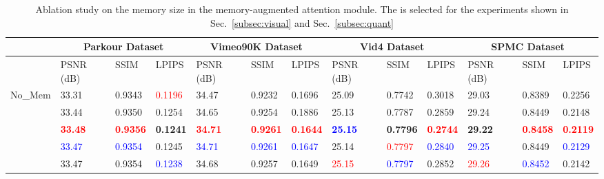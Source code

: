 \begin{table*}[t]
\footnotesize
\centering
\begin{tabular}{p{}||p{}<{\centering}|p{}<{\centering}|p{}<{\centering}||p{}<{\centering}|p{}<{\centering}|p{}<{\centering}||p{}<{\centering}|p{}<{\centering}|p{}<{\centering}||p{}<{\centering}|p{}<{\centering}|p{}<{\centering}}
            & \multicolumn{3}{c||}{Parkour Dataset} & \multicolumn{3}{c||}{Vimeo90K Dataset~\cite{vimeo90k}}    & \multicolumn{3}{c||}{Vid4 Dataset~\cite{frvsr}}  &  \multicolumn{3}{c}{SPMC Dataset~\cite{spmc}}     \\ \hline
            & PSNR (dB)          & SSIM    &LPIPS        & PSNR (dB) & SSIM &LPIPS  & PSNR (dB) & SSIM &LPIPS & PSNR (dB) & SSIM &LPIPS                        \\ \hline
No\_Mem     & 33.31              & 0.9343  &\textcolor{red}{0.1196}        & 34.47    & 0.9232 & 0.1696 & 25.09     & 0.7742  &0.3018 &29.03 &0.8389 &0.2256                    \\ \hline
  & 33.44              & 0.9350     &0.1254     & 34.65       & 0.9254 &0.1886  & 25.13     & 0.7787  &0.2859 &29.24 &0.8449 & 0.2148                   \\ \hline
        & \textbf{\textcolor{red}{33.48}}              & \textbf{\textcolor{red}{0.9356}}    &\textbf{0.1241}      & \textbf{\textcolor{red}{34.71}}               & \textbf{\textcolor{red}{0.9261}} &\textbf{\textcolor{red}{0.1644}}  & \textbf{\textcolor{blue}{25.15}}     & \textbf{0.7796} &\textbf{\textcolor{red}{0.2744}} &\textbf{29.22} &\textbf{\textcolor{red}{0.8458}} &\textbf{\textcolor{red}{0.2119}}                     \\ \hline
      & \textcolor{blue}{33.47}              & \textcolor{blue}{0.9354}   &0.1245       & \textcolor{blue}{34.71}               & \textcolor{blue}{0.9261} &\textcolor{blue}{0.1647}  & 25.14     & \textcolor{red}{0.7797}  &\textcolor{blue}{0.2840} &\textcolor{blue}{29.25} &0.8449 &\textcolor{blue}{0.2129}                    \\ \hline
         & 33.47 & 0.9354  &\textcolor{blue}{0.1238}  & 34.68   & 0.9257 &0.1649   & \textcolor{red}{25.15}     & \textcolor{blue}{0.7797}   &0.2852 &\textcolor{red}{29.26} &\textcolor{blue}{0.8452} &0.2142                   \\ \hline
\end{tabular}
\caption{Ablation study on the memory size in the memory-augmented attention module. The  is selected for the experiments shown in Sec.~\ref{subsec:visual} and Sec.~\ref{subsec:quant}}
\label{tab:ablation}
\end{table*}

